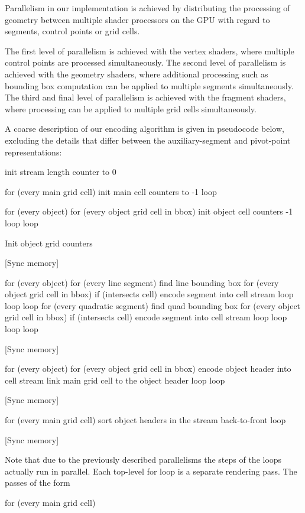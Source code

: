 \documentclass[11pt,a4paper,twoside]{article}
\newenvironment {code}{\footnotesize}{\normalsize}
\begin{document}
Parallelism in our implementation is achieved by distributing the processing of geometry between multiple shader processors on the GPU with regard to segments, control points or grid cells. 

The first level of parallelism is achieved with the vertex shaders, where multiple control points are processed simultaneously. The second level of parallelism is achieved with the geometry shaders, where additional processing such as bounding box computation can be applied to multiple segments simultaneously. The third and final level of parallelism is achieved with the fragment shaders, where processing can be applied to multiple grid cells simultaneously.

A coarse description of our encoding algorithm is given in pseudocode below, excluding the details that differ between the auxiliary-segment and pivot-point representations:

\begin {code}
\begin {verbatimtab}[3]

init stream length counter to 0

for (every main grid cell)
	init main cell counters to -1
loop

for (every object)
	for (every object grid cell in bbox)
		init object cell counters -1
	loop
loop

Init object grid counters

[Sync memory]

for (every object)
	for (every line segment)
		find line bounding box
		for (every object grid cell in bbox)
			if (intersects cell)
				encode segment into cell stream
			loop
		loop
	loop
	for (every quadratic segment)
		find quad bounding box
		for (every object grid cell in bbox)
			if (intersects cell)
				encode segment into cell stream
			loop
		loop
	loop
loop

[Sync memory]

for (every object)
	for (every object grid cell in bbox)
		encode object header into cell stream
		link main grid cell to the object header
	loop
loop

[Sync memory]

for (every main grid cell)
	sort object headers in the stream back-to-front 
loop

[Sync memory]
\end {verbatimtab}
\end {code}

Note that due to the previously described parallelisms the steps of the loops actually run in parallel. Each top-level for loop is a separate rendering pass. The passes of the form
\begin{code}
\begin {verbatimtab}[3]
for (every main grid cell)
\end {verbatimtab}
\end{code}
\end{document}
